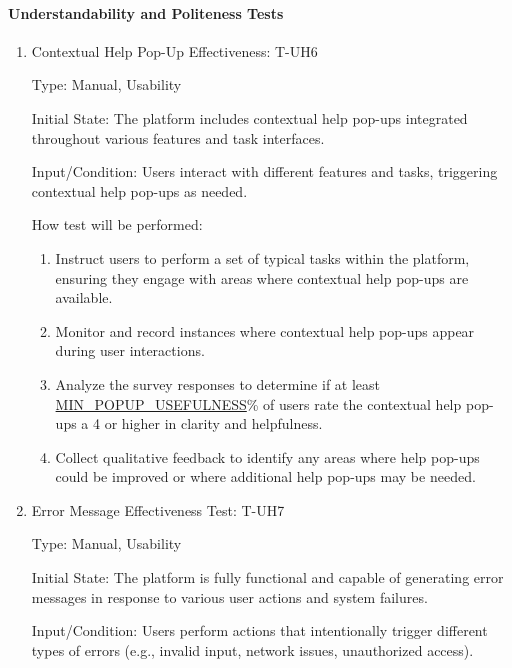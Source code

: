 \documentclass[12pt, titlepage]{article}
\begin{document}
\paragraph{Understandability and Politeness Tests}
\begin{enumerate}

\item{Contextual Help Pop-Up Effectiveness: T-UH6\\}

Type: Manual, Usability

Initial State: The platform includes contextual help pop-ups integrated throughout various features and task interfaces.

Input/Condition: Users interact with different features and tasks, triggering contextual help pop-ups as needed.

How test will be performed:
\begin{enumerate}
    \item Instruct users to perform a set of typical tasks within the platform, ensuring they engage with areas where contextual help pop-ups are available.
    \item Monitor and record instances where contextual help pop-ups appear during user interactions.
    \item Analyze the survey responses to determine if at least \\ \hyperref[MIN_POPUP_USEFULNESS]{MIN\_POPUP\_USEFULNESS}\% of users rate the contextual help pop-ups a 4 or higher in clarity and helpfulness.
    \item Collect qualitative feedback to identify any areas where help pop-ups could be improved or where additional help pop-ups may be needed.
\end{enumerate}

\item{Error Message Effectiveness Test: T-UH7\\}

Type: Manual, Usability

Initial State: The platform is fully functional and capable of generating error messages in response to various user actions and system failures.

Input/Condition: Users perform actions that intentionally trigger different types of errors (e.g., invalid input, network issues, unauthorized access).


\end{enumerate}
\end{document}
